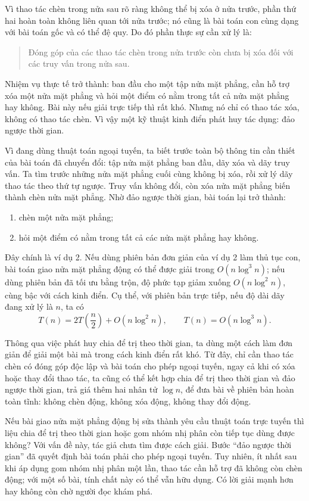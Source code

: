 \documentclass[11pt]{article}
\begin{document}
Vì thao tác chèn trong nửa sau rõ ràng không thể bị xóa ở nửa trước, phần
thứ hai hoàn toàn không liên quan tới nửa trước; nó cũng là bài toán con
cùng dạng với bài toán gốc và có thể đệ quy. Do đó phần thực sự cần xử lý
là:
\begin{quote}
Đóng góp của các thao tác chèn trong nửa trước còn chưa bị xóa đối với các
truy vấn trong nửa sau.
\end{quote}

Nhiệm vụ thực tế trở thành: ban đầu cho một tập nửa mặt phẳng, cần hỗ trợ
xóa một nửa mặt phẳng và hỏi một điểm có nằm trong tất cả nửa mặt phẳng hay
không. Bài này nếu giải trực tiếp thì rất khó. Nhưng nó chỉ có thao tác xóa,
không có thao tác chèn. Vì vậy một kỹ thuật kinh điển phát huy tác dụng:
đảo ngược thời gian.

Vì đang dùng thuật toán ngoại tuyến, ta biết trước toàn bộ thông tin cần
thiết của bài toán đã chuyển đổi: tập nửa mặt phẳng ban đầu, dãy xóa và dãy
truy vấn. Ta tìm trước những nửa mặt phẳng cuối cùng không bị xóa, rồi xử lý
dãy thao tác theo thứ tự ngược. Truy vấn không đổi, còn xóa nửa mặt phẳng
biến thành chèn nửa mặt phẳng. Nhờ đảo ngược thời gian, bài toán lại trở
thành:
\begin{enumerate}
  \item chèn một nửa mặt phẳng;
  \item hỏi một điểm có nằm trong tất cả các nửa mặt phẳng hay không.
\end{enumerate}

Đây chính là ví dụ 2. Nếu dùng phiên bản đơn giản của ví dụ 2 làm thủ tục
con, bài toán giao nửa mặt phẳng động có thể được giải trong
\(O(n\log^3 n)\); nếu dùng phiên bản đã tối ưu bằng trộn, độ phức tạp giảm
xuống \(O(n\log^2 n)\), cùng bậc với cách kinh điển.
Cụ thể, với phiên bản trực tiếp, nếu độ dài dãy đang xử lý là \(n\), ta có
\[
  T(n)=2T\!\left(\frac n2\right)+O(n\log^2 n),
  \qquad
  T(n)=O(n\log^3 n).
\]

Thông qua việc phát huy chia để trị theo thời gian, ta dùng một cách làm đơn
giản để giải một bài mà trong cách kinh điển rất khó. Từ đây, chỉ cần thao
tác chèn có đóng góp độc lập và bài toán cho phép ngoại tuyến, ngay cả khi
có xóa hoặc thay đổi thao tác, ta cũng có thể kết hợp chia để trị theo thời
gian và đảo ngược thời gian, trả giá thêm hai nhân tử \(\log n\), để đưa bài
về phiên bản hoàn toàn tĩnh: không chèn động, không xóa động, không thay đổi
động.

Nếu bài giao nửa mặt phẳng động bị sửa thành yêu cầu thuật toán trực tuyến
thì liệu chia để trị theo thời gian hoặc gom nhóm nhị phân còn tiếp tục dùng
được không? Với vấn đề này, tác giả chưa tìm được cách giải. Bước ``đảo
ngược thời gian'' đã quyết định bài toán phải cho phép ngoại tuyến. Tuy
nhiên, ít nhất sau khi áp dụng gom nhóm nhị phân một lần, thao tác cần hỗ
trợ đã không còn chèn động; với một số bài, tính chất này có thể vẫn hữu
dụng. Có lời giải mạnh hơn hay không còn chờ người đọc khám phá.
\end{document}
